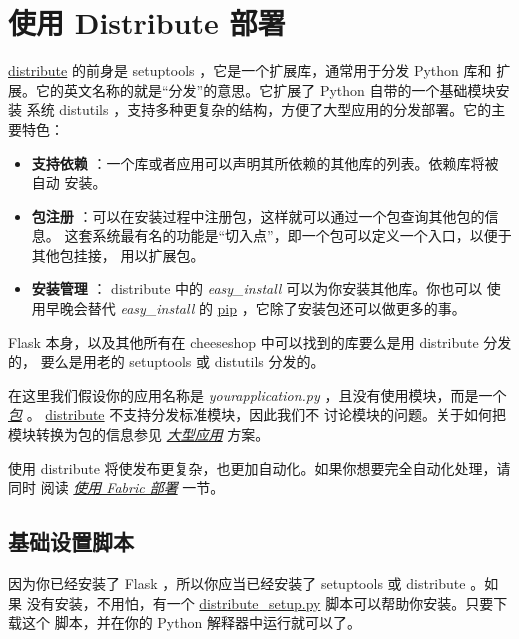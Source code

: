 \documentclass[a4paper,12pt]{sphinxmanual}
\begin{document}
\section{使用 Distribute 部署}
\label{patterns/distribute:distribute}\label{patterns/distribute::doc}\label{patterns/distribute:distribute-deployment}
\href{http://pypi.python.org/pypi/distribute}{distribute} 的前身是 setuptools ，它是一个扩展库，通常用于分发 Python 库和
扩展。它的英文名称的就是“分发”的意思。它扩展了 Python 自带的一个基础模块安装
系统 distutils ，支持多种更复杂的结构，方便了大型应用的分发部署。它的主要特色：
\begin{itemize}
\item {} 
\textbf{支持依赖} ：一个库或者应用可以声明其所依赖的其他库的列表。依赖库将被自动
安装。

\item {} 
\textbf{包注册} ：可以在安装过程中注册包，这样就可以通过一个包查询其他包的信息。
这套系统最有名的功能是“切入点”，即一个包可以定义一个入口，以便于其他包挂接，
用以扩展包。

\item {} 
\textbf{安装管理} ： distribute 中的 \emph{easy\_install} 可以为你安装其他库。你也可以
使用早晚会替代 \emph{easy\_install} 的 \href{http://pypi.python.org/pypi/pip}{pip} ，它除了安装包还可以做更多的事。

\end{itemize}

Flask 本身，以及其他所有在 cheeseshop 中可以找到的库要么是用 distribute 分发的，
要么是用老的 setuptools 或 distutils 分发的。

在这里我们假设你的应用名称是 \emph{yourapplication.py} ，且没有使用模块，而是一个
{\hyperref[patterns/packages:larger-applications]{\emph{包}}} 。 \href{http://pypi.python.org/pypi/distribute}{distribute} 不支持分发标准模块，因此我们不
讨论模块的问题。关于如何把模块转换为包的信息参见 {\hyperref[patterns/packages:larger-applications]{\emph{大型应用}}}
方案。

使用 distribute 将使发布更复杂，也更加自动化。如果你想要完全自动化处理，请同时
阅读 {\hyperref[patterns/fabric:fabric-deployment]{\emph{使用 Fabric 部署}}} 一节。


\subsection{基础设置脚本}
\label{patterns/distribute:id1}
因为你已经安装了 Flask ，所以你应当已经安装了 setuptools 或 distribute 。如果
没有安装，不用怕，有一个 \href{http://python-distribute.org/distribute\_setup.py}{distribute\_setup.py} 脚本可以帮助你安装。只要下载这个
脚本，并在你的 Python 解释器中运行就可以了。
\end{document}
